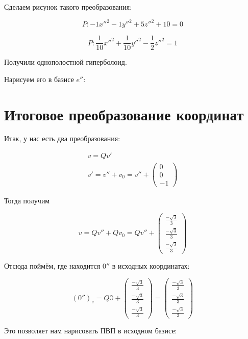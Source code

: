 \documentclass[12pt, a4paper]{article}
\begin{document}
    Сделаем рисунок такого преобразования:

    

    \begin{equation}
        P: -1 x''^2 -1 y''^2 + 5 z''^2 + 10 = 0
    \end{equation}

    \begin{equation}
        P: \frac{1}{10} x''^2 + \frac{1}{10} y''^2 - \frac{1}{2} z''^2 = 1
    \end{equation}

    Получили однополостной гиперболоид.

    Нарисуем его в базисе $e''$:


    \section{Итоговое преобразование координат}

    Итак, у нас есть два преобразования:


    \begin{gather}
        v = Q v' \\
        v' = v'' + v_0 = v'' + \begin{pmatrix}
            0 \\ 0 \\ -1
        \end{pmatrix}
    \end{gather}

    Тогда получим

    \begin{equation}
        v = Q v'' + Q v_0 = Q v'' + \left(\begin{matrix}
            \frac{-\sqrt{3}}{3} \\
            \frac{-\sqrt{3}}{3} \\
            \frac{-\sqrt{3}}{3}
        \end{matrix}\right)
    \end{equation}

    Отсюда поймём, где находится $0''$ в исходных координатах:

    \begin{equation}
        (0'')_e = Q \mathbb{0} + \left(\begin{matrix}
            \frac{-\sqrt{3}}{3} \\
            \frac{-\sqrt{3}}{3} \\
            \frac{-\sqrt{3}}{3}
        \end{matrix}\right) = \left(\begin{matrix}
            \frac{-\sqrt{3}}{3} \\
            \frac{-\sqrt{3}}{3} \\
            \frac{-\sqrt{3}}{3}
    \end{matrix}\right)
    \end{equation}

    Это позволяет нам нарисовать ПВП в исходном базисе:

    
\end{document}
